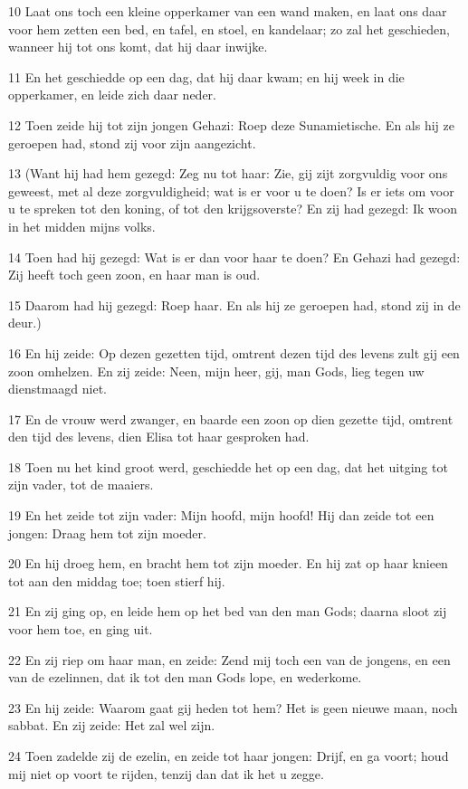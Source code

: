 \par 10 Laat ons toch een kleine opperkamer van een wand maken, en laat ons daar voor hem zetten een bed, en tafel, en stoel, en kandelaar; zo zal het geschieden, wanneer hij tot ons komt, dat hij daar inwijke.
\par 11 En het geschiedde op een dag, dat hij daar kwam; en hij week in die opperkamer, en leide zich daar neder.
\par 12 Toen zeide hij tot zijn jongen Gehazi: Roep deze Sunamietische. En als hij ze geroepen had, stond zij voor zijn aangezicht.
\par 13 (Want hij had hem gezegd: Zeg nu tot haar: Zie, gij zijt zorgvuldig voor ons geweest, met al deze zorgvuldigheid; wat is er voor u te doen? Is er iets om voor u te spreken tot den koning, of tot den krijgsoverste? En zij had gezegd: Ik woon in het midden mijns volks.
\par 14 Toen had hij gezegd: Wat is er dan voor haar te doen? En Gehazi had gezegd: Zij heeft toch geen zoon, en haar man is oud.
\par 15 Daarom had hij gezegd: Roep haar. En als hij ze geroepen had, stond zij in de deur.)
\par 16 En hij zeide: Op dezen gezetten tijd, omtrent dezen tijd des levens zult gij een zoon omhelzen. En zij zeide: Neen, mijn heer, gij, man Gods, lieg tegen uw dienstmaagd niet.
\par 17 En de vrouw werd zwanger, en baarde een zoon op dien gezette tijd, omtrent den tijd des levens, dien Elisa tot haar gesproken had.
\par 18 Toen nu het kind groot werd, geschiedde het op een dag, dat het uitging tot zijn vader, tot de maaiers.
\par 19 En het zeide tot zijn vader: Mijn hoofd, mijn hoofd! Hij dan zeide tot een jongen: Draag hem tot zijn moeder.
\par 20 En hij droeg hem, en bracht hem tot zijn moeder. En hij zat op haar knieen tot aan den middag toe; toen stierf hij.
\par 21 En zij ging op, en leide hem op het bed van den man Gods; daarna sloot zij voor hem toe, en ging uit.
\par 22 En zij riep om haar man, en zeide: Zend mij toch een van de jongens, en een van de ezelinnen, dat ik tot den man Gods lope, en wederkome.
\par 23 En hij zeide: Waarom gaat gij heden tot hem? Het is geen nieuwe maan, noch sabbat. En zij zeide: Het zal wel zijn.
\par 24 Toen zadelde zij de ezelin, en zeide tot haar jongen: Drijf, en ga voort; houd mij niet op voort te rijden, tenzij dan dat ik het u zegge.
